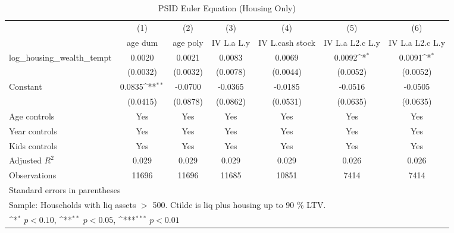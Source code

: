 {
\def\sym#1{\ifmmode^{#1}\else\(^{#1}\)\fi}
\begin{longtable}{l*{6}{c}}
\caption{PSID Euler Equation (Housing Only)}\\
\toprule\endfirsthead\midrule\endhead\midrule\endfoot\endlastfoot
                    &\multicolumn{1}{c}{(1)}&\multicolumn{1}{c}{(2)}&\multicolumn{1}{c}{(3)}&\multicolumn{1}{c}{(4)}&\multicolumn{1}{c}{(5)}&\multicolumn{1}{c}{(6)}\\
                    &\multicolumn{1}{c}{age dum}&\multicolumn{1}{c}{age poly}&\multicolumn{1}{c}{IV L.a L.y}&\multicolumn{1}{c}{IV L.cash stock}&\multicolumn{1}{c}{IV L.a L2.c L.y}&\multicolumn{1}{c}{IV L.a L2.c L.y}\\
\midrule
log\_housing\_wealth\_tempt&      0.0020         &      0.0021         &      0.0083         &      0.0069         &      0.0092\sym{*}  &      0.0091\sym{*}  \\
                    &    (0.0032)         &    (0.0032)         &    (0.0078)         &    (0.0044)         &    (0.0052)         &    (0.0052)         \\
\addlinespace
Constant            &      0.0835\sym{**} &     -0.0700         &     -0.0365         &     -0.0185         &     -0.0516         &     -0.0505         \\
                    &    (0.0415)         &    (0.0878)         &    (0.0862)         &    (0.0531)         &    (0.0635)         &    (0.0635)         \\
\addlinespace
Age controls        &         Yes         &         Yes         &         Yes         &         Yes         &         Yes         &         Yes         \\
\addlinespace
Year controls       &         Yes         &         Yes         &         Yes         &         Yes         &         Yes         &         Yes         \\
\addlinespace
Kids controls       &         Yes         &         Yes         &         Yes         &         Yes         &         Yes         &         Yes         \\
\midrule
Adjusted \(R^{2}\)  &       0.029         &       0.029         &       0.029         &       0.029         &       0.026         &       0.026         \\
Observations        &       11696         &       11696         &       11685         &       10851         &        7414         &        7414         \\
\bottomrule
\multicolumn{7}{l}{\footnotesize Standard errors in parentheses}\\
\multicolumn{7}{l}{\footnotesize Sample: Households with liq assets $>$ 500. Ctilde is liq plus housing up to 90 \% LTV.}\\
\multicolumn{7}{l}{\footnotesize \sym{*} \(p<0.10\), \sym{**} \(p<0.05\), \sym{***} \(p<0.01\)}\\
\end{longtable}
}
